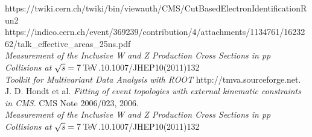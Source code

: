 \begin{thebibliography}{99}


 https://twiki.cern.ch/twiki/bin/viewauth/CMS/CutBasedElectronIdentificationRun2 \\
 https://indico.cern.ch/event/369239/contribution/4/attachments/1134761/1623262/talk\_effective\_areas\_25ns.pdf\\
 \textit{Measurement of the Inclusive W and Z Production Cross Sections in pp Collisions at $\sqrt{s}=7\:\mathrm{Te\kern -0.1em V}$}.10.1007/JHEP10(2011)132\\
 \textit{Toolkit for Multivariant Data Analysis with ROOT} http://tmva.sourceforge.net.\\
 J. D. Hondt et al. \textit{Fitting of event topologies with external kinematic constraints in CMS}. CMS Note 2006/023, 2006.\\
  \textit{Measurement of the Inclusive W and Z Production Cross Sections in pp Collisions at $\sqrt{s}=7\:\mathrm{Te\kern -0.1em V}$}.10.1007/JHEP10(2011)132\\

\end{thebibliography}
